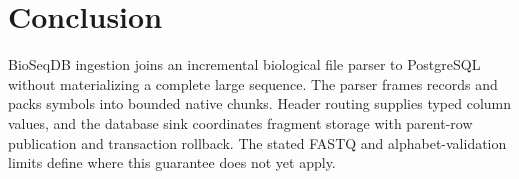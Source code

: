 \section{Conclusion}

BioSeqDB ingestion joins an incremental biological file parser to PostgreSQL
without materializing a complete large sequence. The parser frames records and
packs symbols into bounded native chunks. Header routing supplies typed column
values, and the database sink coordinates fragment storage with parent-row
publication and transaction rollback. The stated FASTQ and alphabet-validation
limits define where this guarantee does not yet apply.
